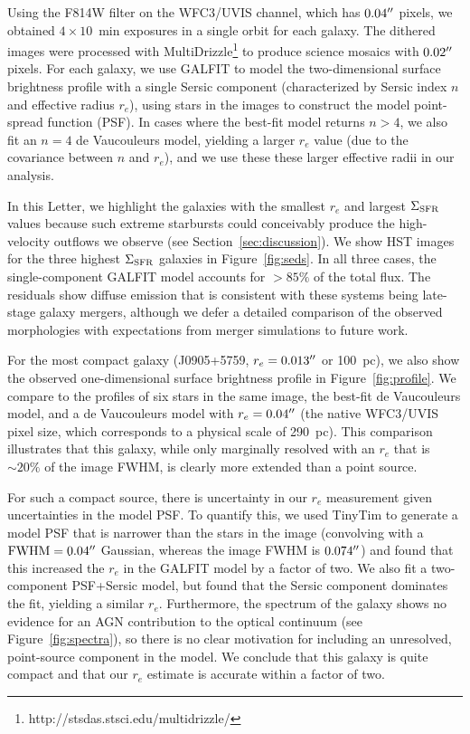 \documentclass[apj]{emulateapj}
\newcommand{\sigmasfr}{\Sigma_{\textnormal{\scriptsize{SFR}}}}
\begin{document}
Using the F814W filter on the WFC3/UVIS channel, which has
$0.04\mbox{$^{\prime\prime}$}$ pixels, we obtained $4\times10$~min exposures in a
single orbit for each galaxy.  The dithered images were processed with
MultiDrizzle\footnote{http://stsdas.stsci.edu/multidrizzle/} to
produce science mosaics with $0.02\mbox{$^{\prime\prime}$}$ pixels.  For each galaxy,
we use GALFIT \citep{pen02} to model the two-dimensional surface
brightness profile with a single Sersic component (characterized by
Sersic index $n$ and effective radius $r_e$), using stars in the
images to construct the model point-spread function (PSF).  In cases
where the best-fit model returns $n>4$, we also fit an $n=4$ de
Vaucouleurs model, yielding a larger $r_e$ value (due to the
covariance between $n$ and $r_e$), and we use these these larger
effective radii in our analysis.

In this Letter, we highlight the galaxies with the smallest $r_e$ and
largest $\sigmasfr$ values because such extreme starbursts could
conceivably produce the high-velocity outflows we observe (see
Section~\ref{sec:discussion}).  We show HST images for the three
highest $\sigmasfr$ galaxies in Figure~\ref{fig:seds}.  In all three
cases, the single-component GALFIT model accounts for $>85\%$ of the
total flux.  The residuals show diffuse emission that is consistent
with these systems being late-stage galaxy mergers, although we defer
a detailed comparison of the observed morphologies with expectations
from merger simulations to future work.

For the most compact galaxy (J0905+5759, $r_e=0.013\mbox{$^{\prime\prime}$}$ or
100~pc), we also show the observed one-dimensional surface brightness
profile in Figure~\ref{fig:profile}.  We compare to the profiles of
six stars in the same image, the best-fit de Vaucouleurs model, and a
de Vaucouleurs model with $r_e=0.04\mbox{$^{\prime\prime}$}$ (the native WFC3/UVIS
pixel size, which corresponds to a physical scale of 290~pc).  This
comparison illustrates that this galaxy, while only marginally
resolved with an $r_e$ that is $\sim20\%$ of the image FWHM, is
clearly more extended than a point source.

For such a compact source, there is uncertainty in our $r_e$
measurement given uncertainties in the model PSF.  To quantify this,
we used TinyTim to generate a model PSF that is narrower than the
stars in the image (convolving with a $\textnormal{FWHM}=0.04\mbox{$^{\prime\prime}$}$
Gaussian, whereas the image FWHM is $0.074\mbox{$^{\prime\prime}$}$) and found that
this increased the $r_e$ in the GALFIT model by a factor of two.  We
also fit a two-component PSF+Sersic model, but found that the Sersic
component dominates the fit, yielding a similar $r_e$.  Furthermore,
the spectrum of the galaxy shows no evidence for an AGN contribution
to the optical continuum (see Figure~\ref{fig:spectra}), so there is
no clear motivation for including an unresolved, point-source
component in the model.  We conclude that this galaxy is quite compact
and that our $r_e$ estimate is accurate within a factor of two.
\end{document}
